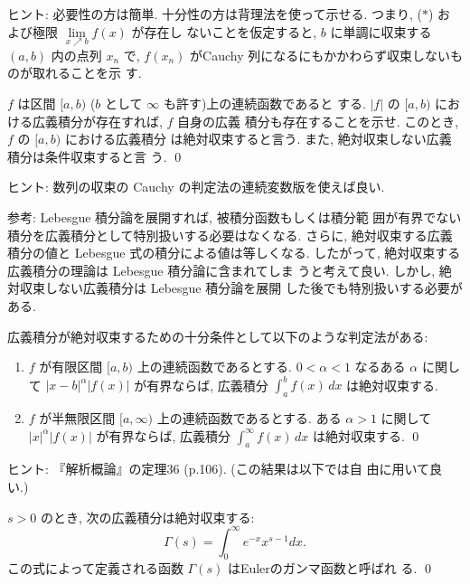 \documentclass[12pt,twoside]{jarticle}
\begin{document}
\noindent ヒント: 必要性の方は簡単. 十分性の方は背理法を使って示せる. 
つまり, ($\ast$) および極限 $\lim\limits_{x\nearrow b} f(x)$ が存在し
ないことを仮定すると, $b$ に単調に収束する $(a,b)$ 内の点列 $x_n$ で, %
$f(x_n)$ がCauchy 列になるにもかかわらず収束しないものが取れることを示
す.

\begin{question}[広義積分の絶対収束の定義]
  $f$ は区間 $[a,b)$ ($b$ として $\infty$ も許す)上の連続函数であると
  する. $|f|$ の $[a,b)$ における広義積分が存在すれば, $f$ 自身の広義
  積分も存在することを示せ. このとき, $f$ の $[a,b)$ における広義積分
  は絶対収束すると言う. また, 絶対収束しない広義積分は条件収束すると言
  う. \qed
\end{question}

\noindent ヒント: 数列の収束の Cauchy の判定法の連続変数版を使えば良い.

\begin{small}

\noindent 参考: Lebesgue 積分論を展開すれば, 被積分函数もしくは積分範
囲が有界でない積分を広義積分として特別扱いする必要はなくなる. さらに, 
絶対収束する広義積分の値と Lebesgue 式の積分による値は等しくなる. 
したがって, 絶対収束する広義積分の理論は Lebesgue 積分論に含まれてしま
うと考えて良い. しかし, 絶対収束しない広義積分は Lebesgue 積分論を展開
した後でも特別扱いする必要がある.

\end{small}

\begin{question}
  広義積分が絶対収束するための十分条件として以下のような判定法がある:
  \begin{enumerate}
  \item $f$ が有限区間 $[a,b)$ 上の連続函数であるとする. %
    $0 < \alpha < 1$ なるある $\alpha$ に関して %
    $|x - b|^\alpha |f(x)|$ が有界ならば, %
    広義積分 $\int_a^b f(x)\,dx$ は絶対収束する.
  \item $f$ が半無限区間 $[a,\infty)$ 上の連続函数であるとする. %
    ある $\alpha > 1$ に関して $|x|^\alpha |f(x)|$ が有界ならば, %
    広義積分 $\int_a^\infty f(x)\,dx$ は絶対収束する.
    \qed
  \end{enumerate}
\end{question}

\noindent ヒント: 『解析概論』の定理36 (p.106).  (この結果は以下では自
由に用いて良い.)

\begin{question}[ガンマ函数]
  $s > 0$ のとき, 次の広義積分は絶対収束する:
  \[
    \Gamma(s) = \int_0^\infty e^{-x} x^{s-1} dx.
  \]
  この式によって定義される函数 $\Gamma(s)$ はEulerのガンマ函数と呼ばれ
  る. \qed
\end{question}
\end{document}
